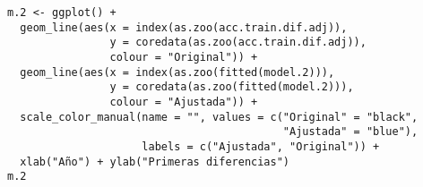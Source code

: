 \documentclass[12pt,a4paper,oneside]{article}
\begin{document}
\begin{Verbatim}[fontsize=\footnotesize]
m.2 <- ggplot() +
  geom_line(aes(x = index(as.zoo(acc.train.dif.adj)),
                y = coredata(as.zoo(acc.train.dif.adj)),
                colour = "Original")) +
  geom_line(aes(x = index(as.zoo(fitted(model.2))),
                y = coredata(as.zoo(fitted(model.2))),
                colour = "Ajustada")) +
  scale_color_manual(name = "", values = c("Original" = "black",
                                           "Ajustada" = "blue"),
                     labels = c("Ajustada", "Original")) +
  xlab("Año") + ylab("Primeras diferencias")
m.2
\end{Verbatim} 
\end{document}
